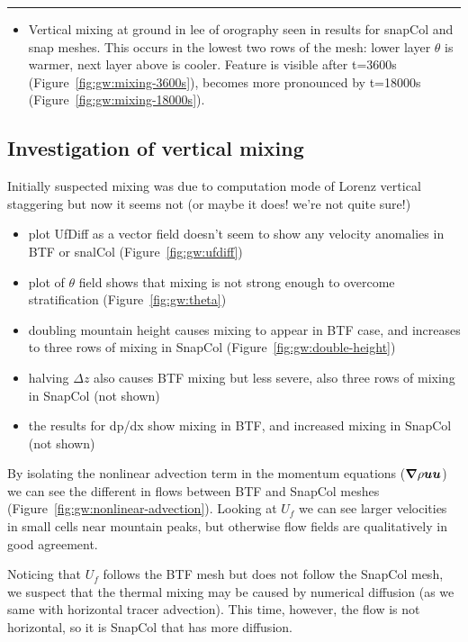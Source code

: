 \hrule
{}

\begin{itemize}
\item Vertical mixing at ground in lee of orography seen in results for snapCol and snap meshes.  This occurs in the lowest two rows of the mesh: lower layer $\theta$ is warmer, next layer above is cooler.  Feature is visible after t=3600s (Figure~\ref{fig:gw:mixing-3600s}), becomes more pronounced by t=18000s (Figure~\ref{fig:gw:mixing-18000s}).
\end{itemize}

\subsection{Investigation of vertical mixing}
Initially suspected mixing was due to computation mode of Lorenz vertical staggering but now it seems not (or maybe it does! we're not quite sure!)
\begin{itemize}
	\item plot UfDiff as a vector field doesn't seem to show any velocity anomalies in BTF or snalCol (Figure~\ref{fig:gw:ufdiff})
	\item plot of $\theta$ field shows that mixing is not strong enough to overcome stratification (Figure~\ref{fig:gw:theta})
	\item doubling mountain height causes mixing to appear in BTF case, and increases to three rows of mixing in SnapCol (Figure~\ref{fig:gw:double-height})
	\item halving $\Delta z$ also causes BTF mixing but less severe, also three rows of mixing in SnapCol (not shown)
	\item the results for dp/dx show mixing in BTF, and increased mixing in SnapCol (not shown)
\end{itemize}


By isolating the nonlinear advection term in the momentum equations ($\boldsymbol{\nabla} \rho \bm{u} \bm{u}$) we can see the different in flows between BTF and SnapCol meshes (Figure~\ref{fig:gw:nonlinear-advection}).  Looking at $U_f$ we can see larger velocities in small cells near mountain peaks, but otherwise flow fields are qualitatively in good agreement.

Noticing that $U_f$ follows the BTF mesh but does not follow the SnapCol mesh, we suspect that the thermal mixing may be caused by numerical diffusion (as we same with horizontal tracer advection).  This time, however, the flow is not horizontal, so it is SnapCol that has more diffusion.

